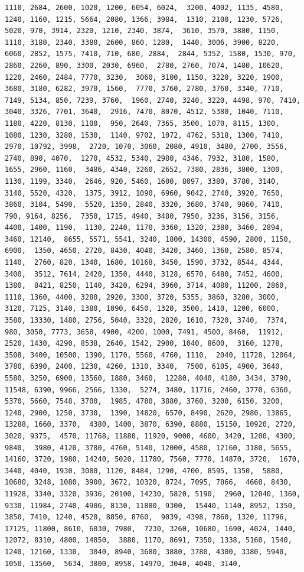 \documentclass[
]{article}
\begin{document}
\begin{verbatim}
1110, 2684, 2600, 1020, 1200, 6054, 6024,  3200, 4002, 1135, 4580, 1240, 1160, 1215, 5664, 2080, 1366, 3984,  1310, 2100, 1230, 5726, 5020, 970, 3914, 2320, 1210, 2340, 3874,  3610, 3570, 3880, 1150, 1110, 3180, 2340, 3380, 2600, 860, 1280,  1440, 3006, 3900, 8220, 6060, 2852, 1575, 7410, 710, 680, 2884,  2844, 5352, 1580, 1530, 970, 2860, 2260, 890, 3300, 2030, 6960,  2780, 2760, 7074, 1480, 10620, 1220, 2460, 2484, 7770, 3230,  3060, 3100, 1150, 3220, 3220, 1900, 3680, 3180, 6282, 3970, 1560,  7770, 3760, 2780, 3760, 3340, 7710, 7149, 5134, 850, 7239, 3760,  1960, 2740, 3240, 3220, 4498, 970, 7410, 3040, 3326, 7701, 3640,  2916, 7470, 8070, 4512, 5380, 1040, 7110, 1180, 4220, 8130, 1100,  950, 2640, 7365, 3500, 1070, 8115, 1300, 1080, 1230, 3280, 1530,  1140, 9702, 1072, 4762, 5318, 1300, 7410, 2970, 10792, 3998,  2720, 1070, 3060, 2080, 4910, 3480, 2700, 3556, 2740, 890, 4070,  1270, 4532, 5340, 2980, 4346, 7932, 3180, 1580, 1655, 2960, 1160,  3486, 4340, 3260, 2652, 7380, 2836, 3800, 1300, 1130, 1199, 3340,  2646, 920, 5460, 1600, 8097, 3380, 3780, 3140, 3140, 5520, 4320,  1375, 3912, 1090, 6960, 9042, 2740, 3920, 7650, 3860, 3104, 5490,  5520, 1350, 2840, 3320, 3680, 3740, 9860, 7410, 790, 9164, 8256,  7350, 1715, 4940, 3480, 7950, 3236, 3156, 3156, 4400, 1400, 1190,  1130, 2240, 1170, 3360, 1320, 2380, 3460, 2894, 3460, 12140,  8655, 5571, 5541, 3240, 1800, 14300, 4590, 2800, 1150, 6900,  1350, 4650, 2720, 8430, 4040, 3420, 3460, 1360, 2580, 8574, 1140,  2760, 820, 1340, 1680, 10168, 3450, 1590, 3732, 8544, 4344, 3400,  3512, 7614, 2420, 1350, 4440, 3128, 6570, 6480, 7452, 4600, 1380,  8421, 8250, 1140, 3420, 6294, 3960, 3714, 4080, 11200, 2860,  1110, 1360, 4400, 3280, 2920, 3300, 3720, 5355, 3860, 3280, 3000,  3120, 7125, 3140, 1380, 1090, 6450, 1320, 3500, 1410, 1200, 6000,  3580, 13330, 1480, 2756, 5040, 3320, 2820, 1610, 7320, 3740,  7374, 980, 3050, 7773, 3658, 4900, 4200, 1000, 7491, 4500, 8460,  11912, 2520, 1430, 4290, 8538, 2640, 1542, 2900, 1040, 8600,  3160, 1278, 3508, 3400, 10500, 1390, 1170, 5560, 4760, 1110,  2040, 11728, 12064, 3780, 6390, 2400, 1230, 4260, 1310, 3340,  7500, 6105, 4900, 3640, 5580, 3250, 6900, 13560, 1880, 3460,  12280, 4040, 4180, 3434, 3790, 11548, 6390, 9966, 2566, 1330,  5274, 3480, 11716, 2460, 3770, 6360, 5370, 5660, 7548, 3700,  1985, 4780, 3880, 3760, 3200, 6150, 3200, 1240, 2900, 1250, 3730,  1390, 14820, 6570, 8490, 2620, 2980, 13865, 13288, 1660, 3370,  4380, 1400, 3870, 6390, 8880, 15150, 10920, 2720, 3020, 9375,  4570, 11768, 11880, 11920, 9000, 4600, 3420, 1200, 4300, 9840,  3980, 4120, 3780, 4760, 5140, 12000, 4580, 12160, 3180, 5655,  14160, 3720, 1980, 14240, 5020, 11780, 7560, 7770, 14870, 3720,  1670, 3440, 4040, 1930, 3080, 1120, 8484, 1290, 4700, 8595, 1350,  5880, 10680, 3248, 1080, 3900, 3672, 10320, 8724, 7095, 7866,  4660, 8430, 11928, 3340, 3320, 3936, 20100, 14230, 5820, 5190,  2960, 12040, 1360, 9330, 11984, 2740, 4906, 8130, 11880, 9300,  15440, 1140, 8952, 1350, 3850, 7410, 1240, 4520, 8850, 8760,  9039, 4398, 7860, 1320, 11796, 17125, 11800, 8610, 6030, 7980,  7230, 3260, 10680, 1690, 4024, 1440, 12072, 8310, 4800, 14850,  3880, 1170, 8691, 7350, 1338, 5160, 1540, 1240, 12160, 1330,  3040, 8940, 3680, 3880, 3780, 4300, 3380, 5940, 1050, 13560,  5634, 3800, 8958, 14970, 3040, 4040, 3140, 
\end{verbatim}
\end{document}
